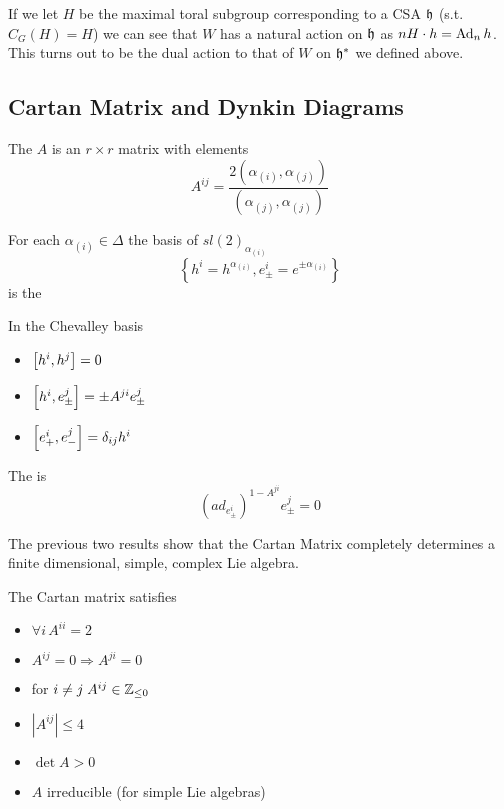 \documentclass{article}
\begin{document}
If we let $H$ be the maximal toral subgroup corresponding to a CSA $\mf{h}$ (s.t. $C_G(H)=H$) we can see that $W$ has a natural action on $\mf{h}$ as $nH \cdot h = \Ad_n h$. This turns out to be the dual action to that of $W$ on $\mf{h}^\ast$ we defined above. 
\subsection{Cartan Matrix and Dynkin Diagrams}

\begin{definition}
	The  $A$ is an $r \times r$ matrix with elements 
	\[
	A^{ij}=\frac{2(\alpha_{(i)},\alpha_{(j)})}{(\alpha_{(j)},\alpha_{(j)})}
	\]
\end{definition}

\begin{definition}
	For each $\alpha_{(i)}\in\Delta$ the basis of $sl(2)_{\alpha_{(i)}}$
	\[
	\left\{ h^i=h^{\alpha_{(i)}}, e^i_\pm=e^{\pm\alpha_{(i)}} \right\}
	\]
	is the 
\end{definition}

\begin{theorem}
	In the Chevalley basis
	\begin{itemize}
		\item $\comm[h^i]{h^j}=0$
		\item $\comm[h^i]{e^j_\pm}=\pm A^{ji} e^j_\pm$
		\item $\comm[e^i_+]{e^j_-}=\delta_{ij} h^i$
	\end{itemize}
\end{theorem}

\begin{theorem}
	The  is 
	\[
	\left( ad_{e^i_\pm}\right)^{1-A^{ji}} e^j_\pm=0
	\]
\end{theorem}

\begin{idea}
	The previous two results show that the Cartan Matrix completely determines a finite dimensional, simple, complex Lie algebra. 
\end{idea}

\begin{theorem}
	The Cartan matrix satisfies
	\begin{itemize}
		\item $\forall i \, A^{ii}=2$
		\item $A^{ij}=0 \Rightarrow A^{ji}=0$
		\item for $i \neq j \; A^{ij}\in\mbb{Z}_{\leq0}$
		\item $|A^{ij}|\leq4$
		\item $\det{A}>0$
		\item $A$ irreducible (for simple Lie algebras)
	\end{itemize}
\end{theorem}
\end{document}
